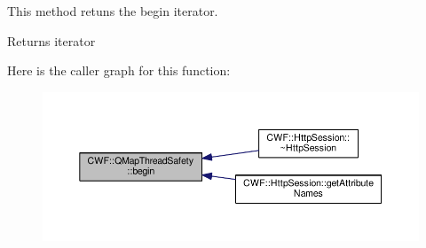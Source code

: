 This method retuns the begin iterator. 

\begin{DoxyReturn}{Returns}
iterator 
\end{DoxyReturn}


Here is the caller graph for this function\+:
\nopagebreak
\begin{figure}[H]
\begin{center}
\leavevmode
\includegraphics[width=350pt]{class_c_w_f_1_1_q_map_thread_safety_a7a80b8b9a85b42ad2e359729f15688b0_icgraph}
\end{center}
\end{figure}


